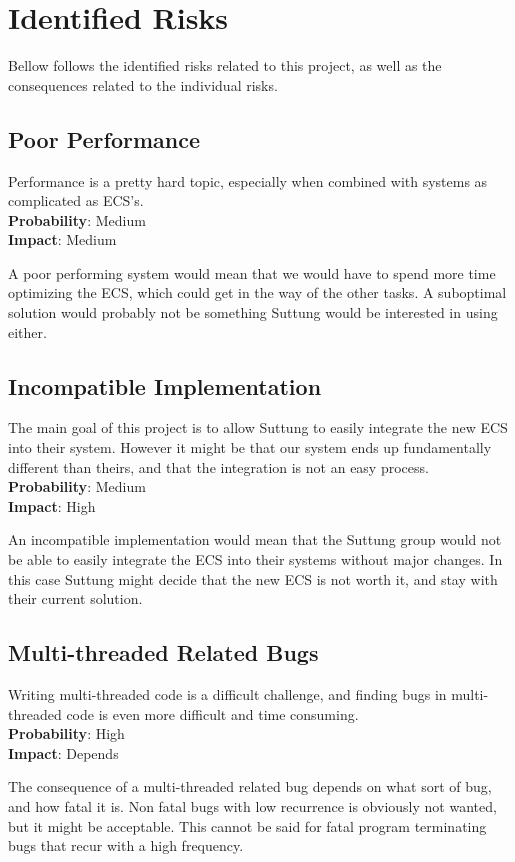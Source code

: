 \section*{Identified Risks}
Bellow follows the identified risks related to this project, 
as well as the consequences related to the individual risks.

\subsection*{Poor Performance}
Performance is a pretty hard topic, especially when combined with
systems as complicated as ECS's.\\
\textbf{Probability}: Medium\\
\textbf{Impact}: Medium

A poor performing system would mean that we would have to spend more time
optimizing the ECS, which could get in the way of the other tasks.
A suboptimal solution would probably not be something Suttung would be interested
in using either.

\subsection*{Incompatible Implementation}
The main goal of this project is to allow Suttung to easily integrate the new ECS
into their system. 
However it might be that our system ends up fundamentally different than theirs,
and that the integration is not an easy process.\\
\textbf{Probability}: Medium\\
\textbf{Impact}: High

An incompatible implementation would mean that the Suttung group would not be able to
easily integrate the ECS into their systems without major changes. 
In this case Suttung might decide that the new ECS is not worth it,
and stay with their current solution.

\subsection*{Multi-threaded Related Bugs}
Writing multi-threaded code is a difficult challenge, and finding bugs in multi-threaded
code is even more difficult and time consuming.\\
\textbf{Probability}: High\\
\textbf{Impact}: Depends

The consequence of a multi-threaded related bug depends on what sort of bug, 
and how fatal it is. Non fatal bugs with low recurrence is obviously not wanted,
but it might be acceptable. This cannot be said for fatal program terminating bugs
that recur with a high frequency.

